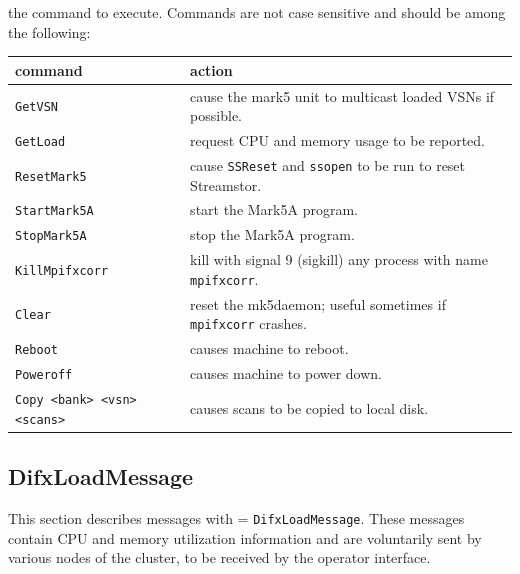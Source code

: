 \begin{description}
\item{} the command to execute.
Commands are not case sensitive and should be among the following:

\begin{tabular}{ll}
command & action\\
\hline
{\tt GetVSN} & cause the mark5 unit to multicast loaded VSNs if possible. \\
{\tt GetLoad} & request CPU and memory usage to be reported. \\
{\tt ResetMark5} & cause {\tt SSReset} and {\tt ssopen} to be run to reset Streamstor. \\
{\tt StartMark5A} & start the Mark5A program. \\
{\tt StopMark5A} & stop the Mark5A program. \\
{\tt KillMpifxcorr} & kill with signal 9 (sigkill) any process with name {\tt mpifxcorr}. \\
{\tt Clear} & reset the mk5daemon; useful sometimes if {\tt mpifxcorr} crashes. \\
{\tt Reboot} & causes machine to reboot. \\
{\tt Poweroff} & causes machine to power down. \\
{\tt Copy <bank> <vsn> <scans>} & causes scans to be copied to local disk. \\
\end{tabular}













\subsection{DifxLoadMessage}

This section describes messages with  = {\tt DifxLoadMessage}.
These messages contain CPU and memory utilization information and are voluntarily sent by various nodes of the cluster, to be received by the operator interface.


\end{description}
